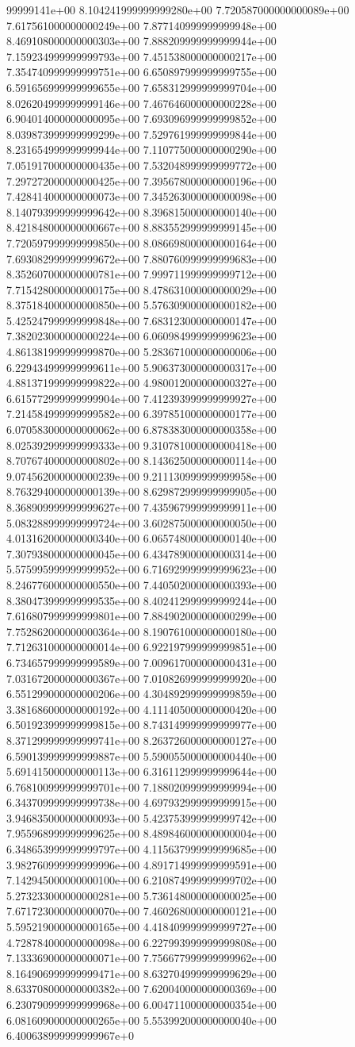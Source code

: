 99999141e+00	8.104241999999999280e+00	7.720587000000000089e+00	7.617561000000000249e+00	7.877140999999999948e+00	8.469108000000000303e+00	7.888209999999999944e+00	7.159234999999999793e+00	7.451538000000000217e+00	7.354740999999999751e+00	6.650897999999999755e+00	6.591656999999999655e+00	7.658312999999999704e+00	8.026204999999999146e+00	7.467646000000000228e+00	6.904014000000000095e+00	7.693096999999999852e+00	8.039873999999999299e+00	7.529761999999999844e+00	8.231654999999999944e+00	7.110775000000000290e+00	7.051917000000000435e+00	7.532048999999999772e+00	7.297272000000000425e+00	7.395678000000000196e+00	7.428414000000000073e+00	7.345263000000000098e+00	8.140793999999999642e+00	8.396815000000000140e+00	8.421848000000000667e+00	8.883552999999999145e+00	7.720597999999999850e+00	8.086698000000000164e+00	7.693082999999999672e+00	7.880760999999999683e+00	8.352607000000000781e+00	7.999711999999999712e+00	7.715428000000000175e+00	8.478631000000000029e+00	8.375184000000000850e+00	5.576309000000000182e+00	5.425247999999999848e+00	7.683123000000000147e+00	7.382023000000000224e+00	6.060984999999999623e+00	4.861381999999999870e+00	5.283671000000000006e+00	6.229434999999999611e+00	5.906373000000000317e+00	4.881371999999999822e+00	4.980012000000000327e+00	6.615772999999999904e+00	7.412393999999999927e+00	7.214584999999999582e+00	6.397851000000000177e+00	6.070583000000000062e+00	6.878383000000000358e+00	8.025392999999999333e+00	9.310781000000000418e+00	8.707674000000000802e+00	8.143625000000000114e+00	9.074562000000000239e+00	9.211130999999999958e+00	8.763294000000000139e+00	8.629872999999999905e+00	8.368909999999999627e+00	7.435967999999999911e+00	5.083288999999999724e+00	3.602875000000000050e+00	4.013162000000000340e+00	6.065748000000000140e+00	7.307938000000000045e+00	6.434789000000000314e+00	5.575995999999999952e+00	6.716929999999999623e+00	8.246776000000000550e+00	7.440502000000000393e+00	8.380473999999999535e+00	8.402412999999999244e+00	7.616807999999999801e+00	7.884902000000000299e+00	7.752862000000000364e+00	8.190761000000000180e+00	7.712631000000000014e+00	6.922197999999999851e+00	6.734657999999999589e+00	7.009617000000000431e+00	7.031672000000000367e+00	7.010826999999999920e+00	6.551299000000000206e+00	4.304892999999999859e+00	3.381686000000000192e+00	4.111405000000000420e+00	6.501923999999999815e+00	8.743149999999999977e+00	8.371299999999999741e+00	8.263726000000000127e+00	6.590139999999999887e+00	5.590055000000000440e+00	5.691415000000000113e+00	6.316112999999999644e+00	6.768100999999999701e+00	7.188020999999999994e+00	6.343709999999999738e+00	4.697932999999999915e+00	3.946835000000000093e+00	5.423753999999999742e+00	7.955968999999999625e+00	8.489846000000000004e+00	6.348653999999999797e+00	4.115637999999999685e+00	3.982760999999999996e+00	4.891714999999999591e+00	7.142945000000000100e+00	6.210874999999999702e+00	5.273233000000000281e+00	5.736148000000000025e+00	7.671723000000000070e+00	7.460268000000000121e+00	5.595219000000000165e+00	4.418409999999999727e+00	4.728784000000000098e+00	6.227993999999999808e+00	7.133369000000000071e+00	7.756677999999999962e+00	8.164906999999999471e+00	8.632704999999999629e+00	8.633708000000000382e+00	7.620040000000000369e+00	6.230790999999999968e+00	6.004711000000000354e+00	6.081609000000000265e+00	5.553992000000000040e+00	6.400638999999999967e+0